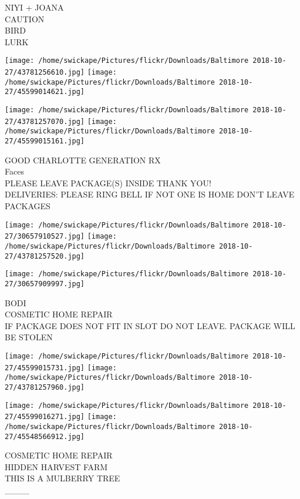 \documentclass[10pt,letterpaper]{article}
\begin{document}
NIYI + JOANA\\
CAUTION\\
BIRD\\
LURK\\
\pagebreak

\texttt{[image: /home/swickape/Pictures/flickr/Downloads/Baltimore 2018-10-27/43781256610.jpg]}
\texttt{[image: /home/swickape/Pictures/flickr/Downloads/Baltimore 2018-10-27/45599014621.jpg]}

\texttt{[image: /home/swickape/Pictures/flickr/Downloads/Baltimore 2018-10-27/43781257070.jpg]}
\texttt{[image: /home/swickape/Pictures/flickr/Downloads/Baltimore 2018-10-27/45599015161.jpg]}

GOOD CHARLOTTE GENERATION RX\\
Faces\\
PLEASE LEAVE PACKAGE(S) INSIDE THANK YOU!\\
DELIVERIES: PLEASE RING BELL IF NOT ONE IS HOME DON'T LEAVE PACKAGES\\
\pagebreak

\texttt{[image: /home/swickape/Pictures/flickr/Downloads/Baltimore 2018-10-27/30657910527.jpg]}
\texttt{[image: /home/swickape/Pictures/flickr/Downloads/Baltimore 2018-10-27/43781257520.jpg]}

\vspace{0.25in}
\texttt{[image: /home/swickape/Pictures/flickr/Downloads/Baltimore 2018-10-27/30657909997.jpg]}

BODI\\
COSMETIC HOME REPAIR\\
IF PACKAGE DOES NOT FIT IN SLOT DO NOT LEAVE.  PACKAGE WILL BE STOLEN\\
\pagebreak

\texttt{[image: /home/swickape/Pictures/flickr/Downloads/Baltimore 2018-10-27/45599015731.jpg]}
\texttt{[image: /home/swickape/Pictures/flickr/Downloads/Baltimore 2018-10-27/43781257960.jpg]}

\texttt{[image: /home/swickape/Pictures/flickr/Downloads/Baltimore 2018-10-27/45599016271.jpg]}
\texttt{[image: /home/swickape/Pictures/flickr/Downloads/Baltimore 2018-10-27/45548566912.jpg]}

COSMETIC HOME REPAIR\\
HIDDEN HARVEST FARM\\
THIS IS A MULBERRY TREE\\
\_\_\_\_\\
\pagebreak
\end{document}
